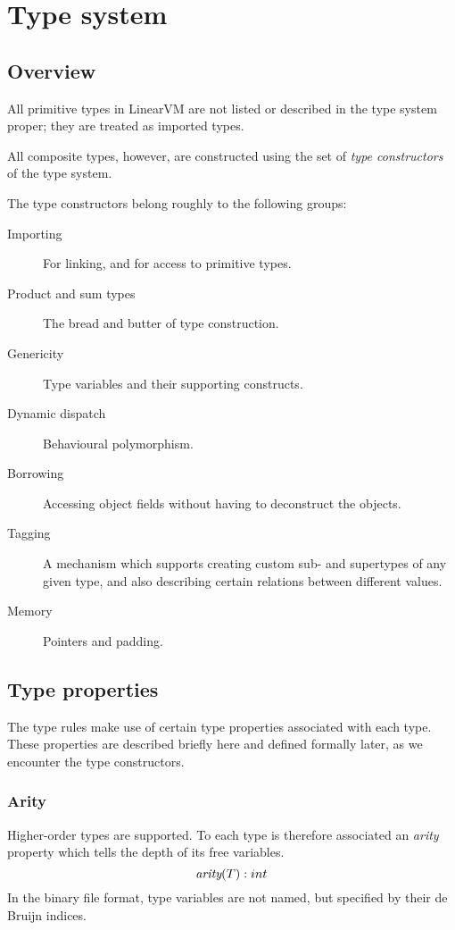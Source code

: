 \documentclass[a4paper]{report}
\newcommand\arity{{\ensuremath\textit{arity}}}
\begin{document}
\chapter{Type system}
\label{chap:typesystem}

\section{Overview}
All primitive types in LinearVM are not listed or described
in the type system proper; they are treated as imported types.

All composite types, however, are constructed using the set of
\emph{type constructors} of the type system.

The type constructors belong roughly to the following groups:
\begin{description}
\item[Importing] For linking, and for access to primitive types.
\item[Product and sum types] The bread and butter of type construction.
\item[Genericity] Type variables and their supporting constructs.
\item[Dynamic dispatch] Behavioural polymorphism.
\item[Borrowing] Accessing object fields without having to deconstruct
  the objects.
\item[Tagging] A mechanism which supports creating custom sub- and
  supertypes of any given type, and also describing certain relations
  between different values.
\item[Memory] Pointers and padding.
\end{description}


\section{Type properties}

The type rules make use of certain type properties associated with each type.
These properties are described briefly here and defined formally later,
as we encounter the type constructors.

\subsection{Arity}
Higher-order types are supported. To each type is therefore associated
an \emph{arity} property which tells the depth of its free variables.
$$
\arity(T) : int
$$
In the binary file format, type variables are not named, but specified
by their de Bruijn indices.
\end{document}
